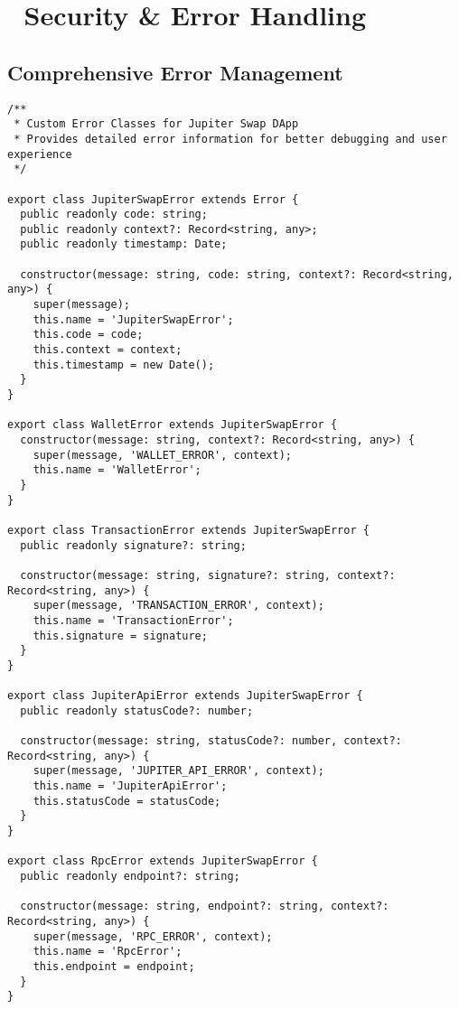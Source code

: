 \documentclass[11pt,a4paper]{article}
\begin{document}
\section{🔐 Security & Error Handling}

\subsection{Comprehensive Error Management}

\begin{lstlisting}[style=typescript, caption=Typed Error System]
/**
 * Custom Error Classes for Jupiter Swap DApp
 * Provides detailed error information for better debugging and user experience
 */

export class JupiterSwapError extends Error {
  public readonly code: string;
  public readonly context?: Record<string, any>;
  public readonly timestamp: Date;

  constructor(message: string, code: string, context?: Record<string, any>) {
    super(message);
    this.name = 'JupiterSwapError';
    this.code = code;
    this.context = context;
    this.timestamp = new Date();
  }
}

export class WalletError extends JupiterSwapError {
  constructor(message: string, context?: Record<string, any>) {
    super(message, 'WALLET_ERROR', context);
    this.name = 'WalletError';
  }
}

export class TransactionError extends JupiterSwapError {
  public readonly signature?: string;
  
  constructor(message: string, signature?: string, context?: Record<string, any>) {
    super(message, 'TRANSACTION_ERROR', context);
    this.name = 'TransactionError';
    this.signature = signature;
  }
}

export class JupiterApiError extends JupiterSwapError {
  public readonly statusCode?: number;
  
  constructor(message: string, statusCode?: number, context?: Record<string, any>) {
    super(message, 'JUPITER_API_ERROR', context);
    this.name = 'JupiterApiError';
    this.statusCode = statusCode;
  }
}

export class RpcError extends JupiterSwapError {
  public readonly endpoint?: string;
  
  constructor(message: string, endpoint?: string, context?: Record<string, any>) {
    super(message, 'RPC_ERROR', context);
    this.name = 'RpcError';
    this.endpoint = endpoint;
  }
}


\end{lstlisting}
\end{document}
